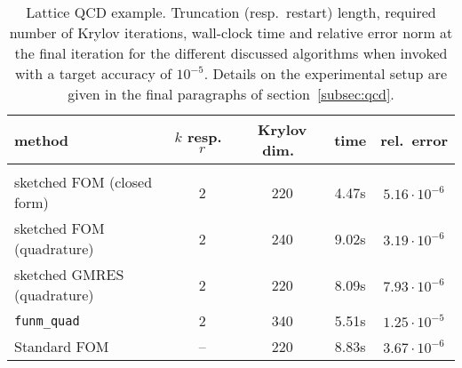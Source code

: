 \begin{table}
\centering
\caption{Lattice QCD example. Truncation (resp.\ restart) length, required number of Krylov iterations, wall-clock time and relative error norm at the final iteration for the different discussed algorithms when invoked with a target accuracy of $10^{-5}$. Details on the experimental setup are given in the final paragraphs of section~\ref{subsec:qcd}.}
\label{tab:qcd}
\begin{tabular}{l|cccc}
method & $k$ resp.\ $r$ & Krylov dim.\ & time & rel.\ error \\[1mm]
\hline\hline\\[-2mm]
sketched FOM (closed form) & 2 & 220 & 4.47s & $5.16 \cdot 10^{-6}$ \\
sketched FOM (quadrature) & 2 & 240 & 9.02s & $3.19 \cdot 10^{-6}$ \\
sketched GMRES (quadrature) & 2 & 220 & 8.09s & $7.93 \cdot 10^{-6}$ \\
\texttt{funm\_quad} &  2 & 340 & 5.51s & $1.25 \cdot 10^{-5}$ \\
Standard FOM & -- & 220 & 8.83s & $3.67 \cdot 10^{-6}$ \\
\end{tabular}
\end{table}